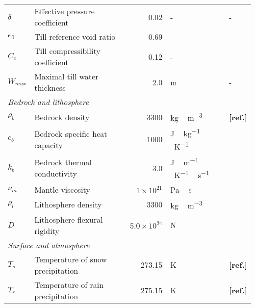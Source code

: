 \documentclass[tc, manuscript]{copernicus}
\newcommand{\aref}[0]{\textbf{[ref.]}}
\begin{document}
\begin{table*}
{\begin{tabular}{llrll}
    $\delta$& Effective pressure coefficient
            & 0.02
            & -
            & - \\

    $e_0$   & Till reference void ratio
            & 0.69
            & -
            & \citet{Tulaczyk.etal.2000} \\

    $C_c$   & Till compressibility coefficient
            & 0.12
            & -
            & \citet{Tulaczyk.etal.2000} \\

    $W_{max}$ & Maximal till water thickness
            & 2.0
            & m
            & - \\

    \multicolumn{2}{l}{\emph{Bedrock and lithosphere}} \\

    $\rho_b$& Bedrock density
            & 3300
            & \unit{kg\,m^{-3}}
            & \aref \\

    $c_b$   & Bedrock specific heat capacity
            & 1000
            & \unit{J\,kg^{-1}\,K^{-1}}
            & \citet{Ritz.1997} \\

    $k_b$   & Bedrock thermal conductivity
            & 3.0
            & \unit{J\,m^{-1}\,K^{-1}\,s^{-1}}
            & \citet{Ritz.1997} \\

    $\nu_m$ & Mantle viscosity
            & $1\times10^21$
            & \unit{Pa\,s}
            & \citet{Lingle.Clark.1985} \\

    $\rho_l$& Lithosphere density
            & 3300
            & \unit{kg\,m^{-3}}
            & \citet{Lingle.Clark.1985} \\

    $D$     & Lithosphere flexural rigidity
            & $5.0\times10^24$
            & \unit{N}
            & \citet{Lingle.Clark.1985} \\

    \multicolumn{2}{l}{\emph{Surface and atmosphere}} \\

    $T_s$   & Temperature of snow precipitation
            & 273.15
            & \unit{K}
            & \aref \\

    $T_r$   & Temperature of rain precipitation
            & 275.15
            & \unit{K}
            & \aref \\


\end{tabular}}
\end{table*}
\end{document}
